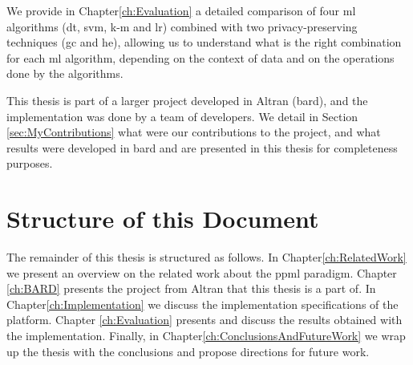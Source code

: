 We provide in Chapter\ref{ch:Evaluation} a detailed comparison of four \ac{ml} algorithms (\ac{dt}, \ac{svm}, \ac{k-m} and \ac{lr}) combined with two privacy-preserving techniques (\ac{gc} and \ac{he}), allowing us to understand what is the right combination for each \ac{ml} algorithm, depending on the context of data and on the operations done by the algorithms.

This thesis is part of a larger project developed in Altran (\ac{bard}), and the implementation was done by a team of developers. We detail in Section \ref{sec:MyContributions} what were our contributions to the project, and what results were developed in \ac{bard} and are presented in this thesis for completeness purposes.



\section{Structure of this Document}
\label{sec:Intro_StructureOfThisDocument}
The remainder of this thesis is structured as follows.
In Chapter\ref{ch:RelatedWork} we present an overview on the related work about the \ac{ppml} paradigm.
Chapter \ref{ch:BARD} presents the project from Altran that this thesis is a part of.
In Chapter\ref{ch:Implementation} we discuss the implementation specifications of the platform.
Chapter \ref{ch:Evaluation} presents and discuss the results obtained with the implementation.
Finally, in Chapter\ref{ch:ConclusionsAndFutureWork} we wrap up the thesis with the conclusions and propose directions for future work.

